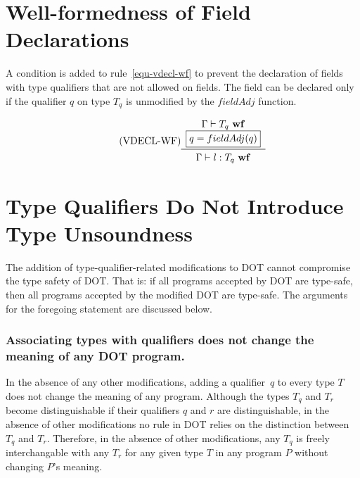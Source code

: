 \begin{comment}

\section{Well-formedness of Method Declarations} 

\end{comment}

\section{Well-formedness of Field Declarations} 

A condition is added to rule~\ref{equ-vdecl-wf} to prevent
the declaration of fields with type qualifiers that are not allowed on fields.
The field can be declared only if the qualifier $q$ on type \mbox{$T_q$}
is unmodified by the \mbox{$fieldAdj$} function.

\begin{equation*}\tag{VDECL-WF}\label{equ-vdecl-wf}
\begin{array}{c}
	\Gamma \vdash T_q\ {\bf wf} \\
	\boxed{q = fieldAdj(q)} \\
	\midrule
	\Gamma \vdash l: T_q\ {\bf wf} \\
\end{array}
\end{equation*}

\vspace{0.4cm}



\section{Type Qualifiers Do Not Introduce Type Unsoundness} \label{dot-qual-typesafe}

The addition of type-qualifier-related modifications to DOT cannot compromise
the type safety of DOT.
That is: if all programs accepted by DOT are type-safe, then all programs
accepted by the modified DOT are type-safe.
The arguments for the foregoing statement are discussed below.

\subsubsection{Associating types with qualifiers does not change the meaning
of any DOT program.}
In the absence of any other modifications, adding a qualifier~$q$ to every type
$T$ does not change the meaning of any program.
Although the types $T_q$ and $T_r$ become distinguishable if their qualifiers
$q$ and $r$ are distinguishable, in the absence of other modifications
no rule in DOT relies on the distinction between $T_q$ and $T_r$.
Therefore, in the absence of other modifications, any $T_q$ is freely interchangable
with any $T_r$ for any given type $T$ in any program $P$ without changing $P$'s meaning.

